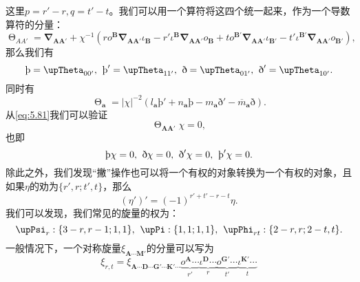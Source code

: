 这里$p=r'-r,q=t'-t$。我们可以用一个算符将这四个统一起来，作为一个导数算符的分量：
\begin{equation}
	\upTheta _{AA'} =\boldsymbol{\nabla }_{\boldsymbol{AA} '} +\chi ^{-1} (ro^{\boldsymbol{B}}\boldsymbol{\nabla }_{\boldsymbol{AA} '} \iota _{\boldsymbol{B}} -r'\iota ^{\boldsymbol{B}}\boldsymbol{\nabla }_{\boldsymbol{AA} '} o_{\boldsymbol{B}} +to^{\boldsymbol{B} '}\boldsymbol{\nabla }_{\boldsymbol{AA} '} \iota _{\boldsymbol{B} '} -t'\iota ^{\boldsymbol{B} '}\boldsymbol{\nabla }_{\boldsymbol{AA} '} o_{\boldsymbol{B} '} ),
	\label{eq:5.81}
\end{equation}
那么我们有
\begin{equation*}
	\text{þ}=\upTheta _{00'} ,\kern+0.4em \text{þ}'=\upTheta _{11'} ,\kern+0.4em \text{ð} =\upTheta _{01'} ,\kern+0.4em \text{ð} '=\upTheta _{10'} .
\end{equation*}
同时有
\begin{equation*}
	\upTheta _{\boldsymbol{a}} =| \chi | ^{-2} (l_{\boldsymbol{a}} \text{þ}'+n_{\boldsymbol{a}} \text{þ}-m_{\boldsymbol{a}} \text{ð} '-\overline{m}_{\boldsymbol{a}} \text{ð} ).
\end{equation*}
从\ref{eq:5.81}我们可以验证
\begin{equation*}
	\upTheta _{\boldsymbol{AA} '} \chi =0,
\end{equation*}
也即
\begin{equation*}
	\text{þ}\chi =0,\kern+0.4em \text{ð} \chi =0,\kern+0.4em \text{ð} '\chi =0,\kern+0.4em \text{þ}'\chi =0.
\end{equation*}
除此之外，我们发现“撇”操作也可以将一个有权的对象转换为一个有权的对象，且如果$\eta $的劝为$\{r',r;t',t\}$，那么
\begin{equation*}
	( \eta ') '=( -1)^{r'+t'-r-t} \eta .
\end{equation*}
我们可以发现，我们常见的旋量的权为：
\begin{equation*}
	\upPsi _{r} :\{3-r,r-1;1,1\} ,\kern+0.4em \upPi :\{1,1;1,1\} ,\kern+0.4em \upPhi _{rt} :\{2-r,r;2-t,t\} .
\end{equation*}
一般情况下，一个对称旋量$\xi _{\boldsymbol{A} \cdots \boldsymbol{M} '}$的分量可以写为
\begin{equation*}
	\xi _{r,t} =\xi _{\boldsymbol{A} \cdots \boldsymbol{D} \cdots \boldsymbol{G} '\cdots \boldsymbol{K} '\cdots }\underbrace{o^{\boldsymbol{A}} \cdots }_{r'}\underbrace{\iota ^{\boldsymbol{D}} \cdots }_{r}\underbrace{o^{\boldsymbol{G} '} \cdots }_{t'}\underbrace{\iota ^{\boldsymbol{K} '} \cdots }_{t}
\end{equation*}
